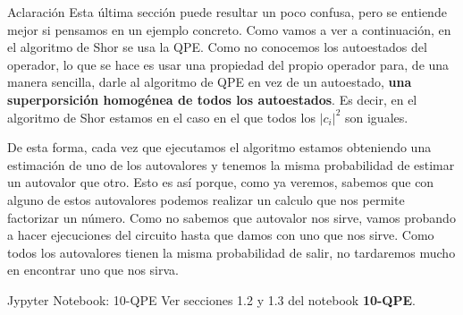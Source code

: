 \documentclass[a4paper,11pt]{book} %
\numberwithin{equation}{chapter}
\begin{document}
	\begin{mybox_blue}{Aclaración}
	Esta última sección puede resultar un poco confusa, pero se entiende mejor si pensamos en un ejemplo concreto. Como vamos a ver a continuación, en el algoritmo de Shor se usa la QPE. Como no conocemos los autoestados del operador, lo que se hace es usar una propiedad del propio operador para, de una manera sencilla, darle al algoritmo de QPE en vez de un autoestado, \textbf{una superporsición homogénea de todos los autoestados}. Es decir, en el algoritmo de Shor estamos en el caso en el que todos los $|c_i|^2$ son iguales. 
	\vspace{0.3cm}
	
	De esta forma, cada vez que ejecutamos el algoritmo estamos obteniendo una estimación de uno de los autovalores y tenemos la misma probabilidad de estimar un autovalor que otro. Esto es así porque, como ya veremos, sabemos que con alguno de estos autovalores podemos realizar un calculo que nos permite factorizar un número. Como no sabemos que autovalor nos sirve, vamos probando a hacer ejecuciones del circuito hasta que damos con uno que nos sirve. Como todos los autovalores tienen la misma probabilidad de salir, no tardaremos mucho en encontrar uno que nos sirva.
	\end{mybox_blue}

	
	\begin{mybox_orange}{Jypyter Notebook: 10-QPE}
	Ver secciones 1.2 y 1.3 del notebook \textbf{10-QPE}.
	\end{mybox_orange}









 



 
\end{document}
